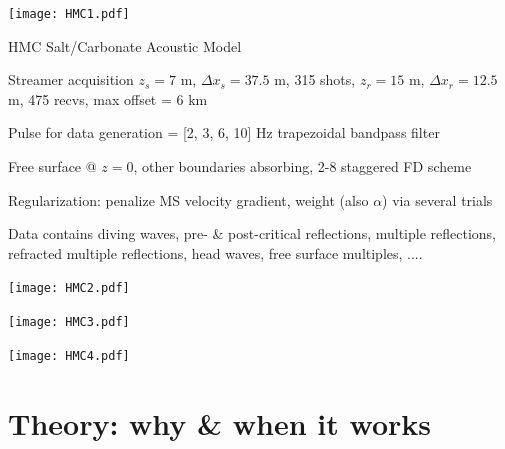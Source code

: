 \documentclass[xcolor=dvipsnames,12pt,aspectratio=169]{beamer}
\begin{document}
\begin{frame}
\begin{center}
\vspace{-0.7in}
\texttt{[image: HMC1.pdf]}
\end{center}
\end{frame}

\begin{frame}
HMC Salt/Carbonate Acoustic Model

Streamer acquisition $z_s = 7$ m, $\Delta x_s=37.5$ m, 315 shots, $z_r=15$ m, $\Delta x_r=12.5$ m, 475 recvs, max offset = $6$ km

Pulse for data generation = [2, 3, 6, 10] Hz trapezoidal bandpass filter

Free surface @ $z=0$, other boundaries absorbing, 2-8 staggered FD scheme

Regularization: penalize MS velocity gradient, weight (also $\alpha$) via several trials

Data contains diving waves, pre- \& post-critical reflections, multiple reflections, refracted multiple reflections, head waves, free surface multiples, .... 

\end{frame}

\begin{frame}
\begin{center}
\vspace{-0.7in}
\texttt{[image: HMC2.pdf]}
\end{center}
\end{frame}

\begin{frame}
\begin{center}
\vspace{-0.7in}
\texttt{[image: HMC3.pdf]}
\end{center}
\end{frame}

\begin{frame}
\begin{center}
\vspace{-0.7in}
\texttt{[image: HMC4.pdf]}
\end{center}
\end{frame}

\section{Theory: why \& when it works}
\end{document}
